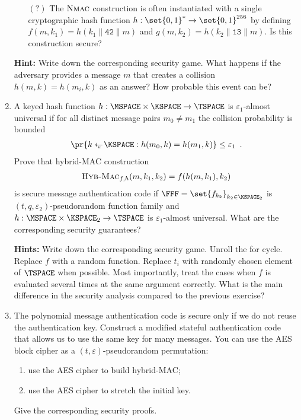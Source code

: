 \documentclass{article}
\begin{document}
\begin{enumerate}
\begin{enumerate}
  \item[$(?)$] The $\textsc{Nmac}$ construction is often instantiated
    with a single cryptographic hash function
    $h:\set{0,1}^*\to\set{0,1}^{256}$ by defining
    $f(m,k_1)=h(k_1\|\texttt{42}\|m)$ and
    $g(m,k_2)=h(k_2\|\texttt{13}\|m)$. Is this construction secure?
  \end{enumerate}

  \textbf{Hint:} Write down the corresponding security game. What
  happens if the adversary provides a message $m$ that creates a
  collision $h(m,k)=h(m_i,k)$ as an answer? How probable this event can be?


\item A keyed hash function $h:\MSPACE\times\KSPACE\to\TSPACE$ is
  $\varepsilon_1$-almost universal if for all distinct message pairs
  $m_0\neq m_1$ the collision probability is bounded
  \begin{align*}
    \pr{k\getsu\KSPACE: h(m_0,k)=h(m_1,k)} \leq \varepsilon_1\enspace.
  \end{align*}
  Prove that hybrid-MAC construction
  \begin{align*}
    \textsc{Hyb-Mac}_{f,h}(m,k_1,k_2)= f(h(m,k_1),k_2)
  \end{align*}
  is secure message authentication code if
  $\FFF=\set{f_{k_2}}_{k_2\in\KSPACE_2}$ is
  $(t,q,\varepsilon_2)$-pseudo\-random function family and
  $h:\MSPACE\times\KSPACE_2\to\TSPACE$ is $\varepsilon_1$-almost
  universal. What are the corresponding security guarantees?
    
  \textbf{Hints:} Write down the corresponding security game. Unroll
  the for cycle. Replace $f$ with a random function. Replace $t_i$
  with randomly chosen element of $\TSPACE$ when possible. Most
  importantly, treat the cases when $f$ is evaluated several times at
  the same argument correctly. What is the main difference in the
  security analysis compared to the previous exercise?



\item The polynomial message authentication code is secure only if we
  do not reuse the authentication key. Construct a modified stateful
  authentication code that allows us to use the same key for many
  messages. You can use the AES block cipher as a
  $(t,\varepsilon)$-pseudorandom permutation:
  \begin{enumerate}
  \item use the AES cipher to build hybrid-MAC; 
  \item use the AES cipher to stretch the initial key.
  \end{enumerate}
  Give the corresponding security proofs.


\end{enumerate}
\end{document}
